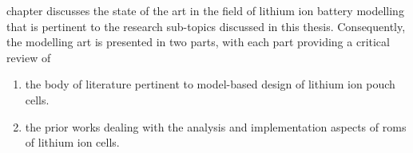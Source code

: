 
 chapter discusses the state of the  art in the field of lithium ion battery
modelling that is pertinent to the research sub-topics discussed in this thesis.
Consequently,  the modelling  art  is presented  in two  parts,  with each  part
providing a critical review of
\begin{enumerate}[topsep=0pt, before={\vspace*{-0.25\baselineskip}}]
    \item the body of literature pertinent to model-based design of lithium ion pouch cells.
    \item the prior works dealing with the analysis and implementation aspects of \glspl{rom} of lithium ion cells.
\end{enumerate}

